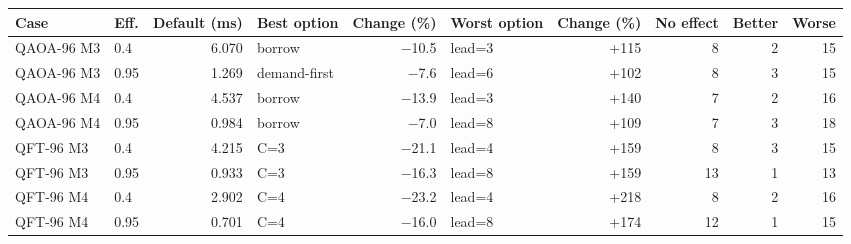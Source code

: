 \begin{tabular}{llrlrlrrrr}
\toprule
Case & Eff. & Default (ms) & Best option & Change (\%) & Worst option & Change (\%) & No effect & Better & Worse \\
\midrule
QAOA-96 M3 & 0.4 & 6.070 & borrow & $-$10.5 & lead=3 & +115 & 8 & 2 & 15 \\
QAOA-96 M3 & 0.95 & 1.269 & demand-first & $-$7.6 & lead=6 & +102 & 8 & 3 & 15 \\
QAOA-96 M4 & 0.4 & 4.537 & borrow & $-$13.9 & lead=3 & +140 & 7 & 2 & 16 \\
QAOA-96 M4 & 0.95 & 0.984 & borrow & $-$7.0 & lead=8 & +109 & 7 & 3 & 18 \\
QFT-96 M3 & 0.4 & 4.215 & C=3 & $-$21.1 & lead=4 & +159 & 8 & 3 & 15 \\
QFT-96 M3 & 0.95 & 0.933 & C=3 & $-$16.3 & lead=8 & +159 & 13 & 1 & 13 \\
QFT-96 M4 & 0.4 & 2.902 & C=4 & $-$23.2 & lead=4 & +218 & 8 & 2 & 16 \\
QFT-96 M4 & 0.95 & 0.701 & C=4 & $-$16.0 & lead=8 & +174 & 12 & 1 & 15 \\
\bottomrule
\end{tabular}
